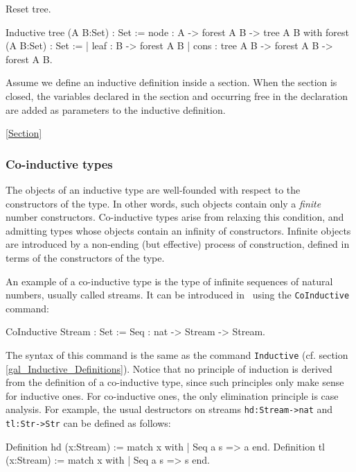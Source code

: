 \begin{coq_eval}
Reset tree.
\end{coq_eval}
\begin{coq_example*}
Inductive tree (A B:Set) : Set :=
    node : A -> forest A B -> tree A B
with forest (A B:Set) : Set :=
  | leaf : B -> forest A B
  | cons : tree A B -> forest A B -> forest A B.
\end{coq_example*}

Assume we define an inductive definition inside a section.  When the
section is closed, the variables declared in the section and occurring
free in the declaration are added as parameters to the inductive
definition. 

\SeeAlso \ref{Section}

\subsubsection{Co-inductive types}

The objects of an inductive type are well-founded with respect to the
constructors of the type. In other words, such objects contain only a
{\it finite} number constructors. Co-inductive types arise from
relaxing this condition, and admitting types whose objects contain an
infinity of constructors. Infinite objects are introduced by a
non-ending (but effective) process of construction, defined in terms
of the constructors of the type.

An example of a co-inductive type is the type of infinite sequences of
natural numbers, usually called streams. It can be introduced in \Coq\
using the \texttt{CoInductive} command:
\begin{coq_example}
CoInductive Stream : Set :=
    Seq : nat -> Stream -> Stream.
\end{coq_example}

The syntax of this command is the same as the command \texttt{Inductive}
(cf. section \ref{gal_Inductive_Definitions}). Notice that no
principle of induction is derived from the definition of a
co-inductive type, since such principles only make sense for inductive
ones. For co-inductive ones, the only elimination principle is case
analysis. For example, the usual destructors on streams
\texttt{hd:Stream->nat} and \texttt{tl:Str->Str} can be defined as
follows:
\begin{coq_example}
Definition hd (x:Stream) := match x with
                            | Seq a s => a
                            end.
Definition tl (x:Stream) := match x with
                            | Seq a s => s
                            end.
\end{coq_example}

